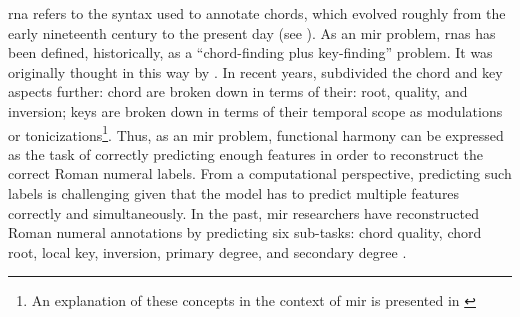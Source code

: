

\gls{rna} refers to the syntax used to annotate chords,
which evolved roughly from the early nineteenth century to
the present day (see
). As an
\gls{mir} problem, \glspl{rna} has been defined,
historically, as a ``chord-finding plus key-finding''
problem. It was originally thought in this way by
\textcite{temperley1997algorithm}. In recent years,
\textcite{chen2018functional} subdivided the chord and key
aspects further: chord are broken down in terms of their:
root, quality, and inversion; keys are broken down in terms
of their temporal scope as modulations or
tonicizations\footnote{An explanation of these concepts in
the context of \gls{mir} is presented in
\textcite{napoleslopez2020local}}. Thus, as an \gls{mir}
problem, functional harmony can be expressed as the task of
correctly predicting enough features in order to reconstruct
the correct Roman numeral labels. From a computational
perspective, predicting such labels is challenging given
that the model has to predict multiple features correctly
and simultaneously. In the past, \gls{mir} researchers have
reconstructed Roman numeral annotations by predicting six
sub-tasks: chord quality, chord root, local key, inversion,
primary degree, and secondary degree
\parencite{chen2018functional, micchi2020not}.







